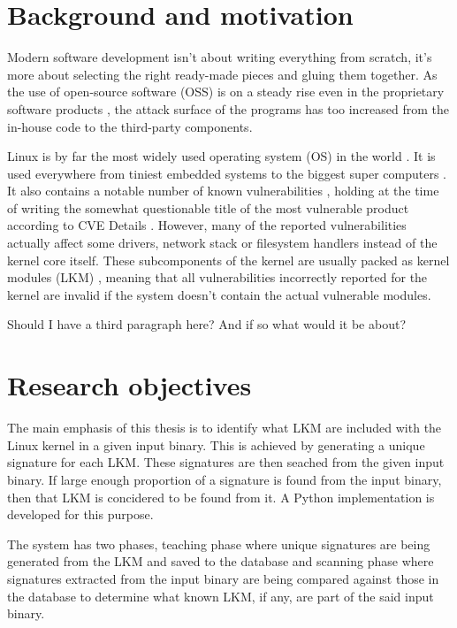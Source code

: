 
\section{Background and motivation}

Modern software development isn't about writing everything from scratch, it's more about selecting
the right ready-made pieces and gluing them together. As the use of open-source software (OSS) is
on a steady rise even in the proprietary software products \cite{deshpande2008total}, the attack
surface of the programs has too increased from the in-house code to the third-party components.

Linux is by far the most widely used operating system (OS) in the world \cite{blah}. It is used
everywhere from tiniest embedded systems \cite{picotux} to the biggest super computers
\cite{top500linuxshare}. It also contains a notable number of known vulnerabilities
\cite{cvedetailslinuxkernel}, holding at the time of writing the somewhat questionable title of the
most vulnerable product according to CVE Details \cite{cvedetailstop50}. However, many of the
reported vulnerabilities actually affect some drivers, network stack or filesystem handlers instead
of the kernel core itself. These subcomponents of the kernel are usually packed as kernel modules
(LKM) \cite{blah}, meaning that all vulnerabilities incorrectly reported for the kernel are invalid
if the system doesn't contain the actual vulnerable modules.

Should I have a third paragraph here? And if so what would it be about?

\section{Research objectives}

The main emphasis of this thesis is to identify what LKM are included with the Linux kernel in a
given input binary. This is achieved by generating a unique signature for each LKM. These
signatures are then seached from the given input binary. If large enough proportion of a signature
is found from the input binary, then that LKM is concidered to be found from it. A Python
implementation is developed for this purpose.

The system has two phases, teaching phase where unique signatures are being generated from the LKM
and saved to the database and scanning phase where signatures extracted from the input binary are
being compared against those in the database to determine what known LKM, if any, are part of the
said input binary.

